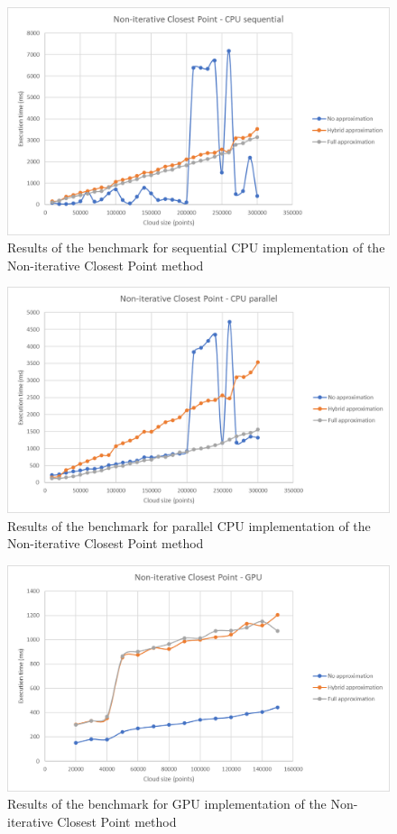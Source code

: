 \documentclass[titlepage]{article}
\begin{document}
\begin{figure}[H]
\includegraphics[width=\textwidth]{ms-nicp-1.png}
\caption{Results of the benchmark for sequential CPU implementation of the Non-iterative Closest Point method}
\end{figure}

\begin{figure}[H]
\includegraphics[width=\textwidth]{ms-nicp-2.png}
\caption{Results of the benchmark for parallel CPU implementation of the Non-iterative Closest Point method}
\end{figure}

\begin{figure}[H]
\includegraphics[width=\textwidth]{ms-nicp-3.png}
\caption{Results of the benchmark for GPU implementation of the Non-iterative Closest Point method}
\end{figure}
\end{document}
